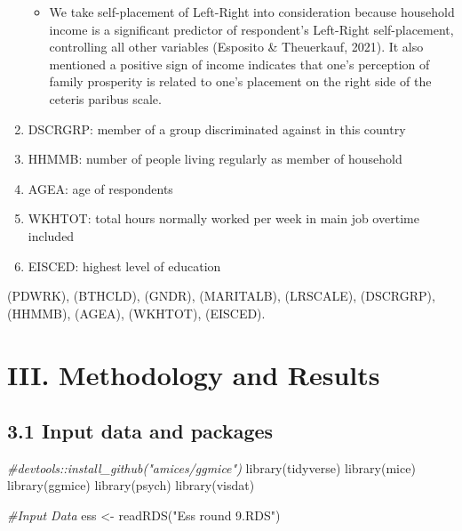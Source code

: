 \documentclass[
]{article}
\newenvironment{Shaded}{\begin{snugshade}}{\end{snugshade}}
\newcommand{\CommentTok}[1]{\textcolor[rgb]{0.56,0.35,0.01}{\textit{#1}}}
\newcommand{\FunctionTok}[1]{\textcolor[rgb]{0.00,0.00,0.00}{#1}}
\newcommand{\NormalTok}[1]{#1}
\newcommand{\OtherTok}[1]{\textcolor[rgb]{0.56,0.35,0.01}{#1}}
\newcommand{\StringTok}[1]{\textcolor[rgb]{0.31,0.60,0.02}{#1}}
\providecommand{\tightlist}{%
  \setlength{\itemsep}{0pt}\setlength{\parskip}{0pt}}
\begin{document}
\begin{enumerate}
  \begin{itemize}
  \tightlist
  \item
    We take self-placement of Left-Right into consideration because
    household income is a significant predictor of respondent's
    Left-Right self-placement, controlling all other variables (Esposito
    \& Theuerkauf, 2021). It also mentioned a positive sign of income
    indicates that one's perception of family prosperity is related to
    one's placement on the right side of the ceteris paribus scale.
  \end{itemize}
\item
  DSCRGRP: member of a group discriminated against in this country
\item
  HHMMB: number of people living regularly as member of household
\item
  AGEA: age of respondents
\item
  WKHTOT: total hours normally worked per week in main job overtime
  included
\item
  EISCED: highest level of education
\end{enumerate}

(PDWRK), (BTHCLD), (GNDR), (MARITALB), (LRSCALE), (DSCRGRP), (HHMMB),
(AGEA), (WKHTOT), (EISCED).

\hypertarget{iii.-methodology-and-results}{%
\section{III. Methodology and
Results}\label{iii.-methodology-and-results}}

\hypertarget{input-data-and-packages}{%
\subsection{3.1 Input data and packages}\label{input-data-and-packages}}

\begin{Shaded}
\begin{Highlighting}[]
\CommentTok{\#devtools::install\_github("amices/ggmice")}
\FunctionTok{library}\NormalTok{(tidyverse)}
\FunctionTok{library}\NormalTok{(mice)}
\FunctionTok{library}\NormalTok{(ggmice)}
\FunctionTok{library}\NormalTok{(psych)}
\FunctionTok{library}\NormalTok{(visdat)}

\CommentTok{\#Input Data}
\NormalTok{ess }\OtherTok{\textless{}{-}} \FunctionTok{readRDS}\NormalTok{(}\StringTok{"Ess round 9.RDS"}\NormalTok{)}
\end{Highlighting}
\end{Shaded}
\end{document}
